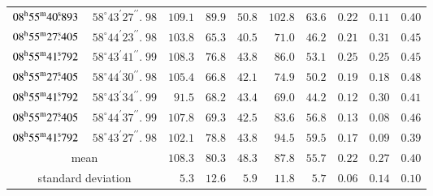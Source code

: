 \documentclass[oldversion]{aa}
\newcommand{\hmsm}[4]{{#1}^{\rm h}{#2}^{\rm m}{#3}^{\rm s}\!\!.\:\!{#4}}
\newcommand{\dmsm}[4]{\, {#1}^{\circ}{#2}^{\prime}{#3}^{\prime\prime}\!\!\!.\;\!{#4}}
\begin{document}
\begin{table}[htbp]
\begin{center}
\begin{tabular}{r r r r r r r r r r}
$ \hmsm{08}{55}{40}{893} $ & $ \dmsm{58}{43}{27}{98} $ & $ 109.1  $ & $  89.9  $ & $  50.8  $ & $ 102.8  $ & $  63.6  $ & $  0.22  $ & $  0.11  $ & $  0.40  $ \\
$ \hmsm{08}{55}{27}{405} $ & $ \dmsm{58}{44}{23}{98} $ & $ 103.8  $ & $  65.3  $ & $  40.5  $ & $  71.0  $ & $  46.2  $ & $  0.21  $ & $  0.31  $ & $  0.45  $ \\
$ \hmsm{08}{55}{41}{792} $ & $ \dmsm{58}{43}{41}{99} $ & $ 108.3  $ & $  76.8  $ & $  43.8  $ & $  86.0  $ & $  53.1  $ & $  0.25  $ & $  0.25  $ & $  0.45  $ \\
$ \hmsm{08}{55}{27}{405} $ & $ \dmsm{58}{44}{30}{98} $ & $ 105.4  $ & $  66.8  $ & $  42.1  $ & $  74.9  $ & $  50.2  $ & $  0.19  $ & $  0.18  $ & $  0.48  $ \\
$ \hmsm{08}{55}{41}{792} $ & $ \dmsm{58}{43}{34}{99} $ & $  91.5  $ & $  68.2  $ & $  43.4  $ & $  69.0  $ & $  44.2  $ & $  0.12  $ & $  0.30  $ & $  0.41  $ \\
$ \hmsm{08}{55}{27}{405} $ & $ \dmsm{58}{44}{37}{99} $ & $ 107.8  $ & $  69.3  $ & $  42.5  $ & $  83.6  $ & $  56.8  $ & $  0.13  $ & $  0.08  $ & $  0.46  $ \\
$ \hmsm{08}{55}{41}{792} $ & $ \dmsm{58}{43}{27}{98} $ & $ 102.1  $ & $  78.8  $ & $  43.8  $ & $  94.5  $ & $  59.5  $ & $  0.17  $ & $  0.09  $ & $  0.39  $ \\
\hline
\multicolumn{2}{c}{mean} &$ 108.3  $ & $  80.3  $ & $  48.3  $ & $  87.8  $ & $  55.7  $ & $  0.22  $ & $  0.27  $ & $  0.40  $ \\
\multicolumn{2}{c}{standard deviation} &$   5.3  $ & $  12.6  $ & $   5.9  $ & $  11.8  $ & $   5.7  $ & $  0.06  $ & $  0.14  $ & $  0.10  $ \\
\hline
\end{tabular}
\end{center}
\end{table}
%
%
\clearpage
\end{document}
